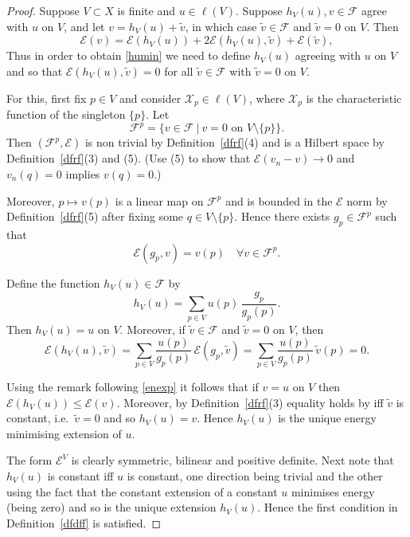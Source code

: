 \documentclass[a4paper]{amsart}
\theoremstyle{plain}
\theoremstyle{definition}
\theoremstyle{remark}
\begin{document}
\begin{proof} Suppose $ V \subset X $ is finite and $ u \in \ell(V) $. 
 Suppose $ h_V(u),v \in \mathcal{F} $ agree  with $ u $ on $ V $,  and  let $   v = h_V(u) + \widetilde{v} $, in which case $ \widetilde{v} \in \mathcal{F} $ and $ \widetilde{v} = 0 $ on $ V $.  Then
\begin{equation} \label{enexp} 
 \mathcal{E} (v) = \mathcal{E} (h_V(u)) + 2\mathcal{E} (h_V(u), \widetilde {v} ) + \mathcal{E} (\widetilde {v} ) ,
\end{equation} 
Thus in order to obtain \eqref{humin} we need to define $ h_V(u) $   agreeing with $ u $ on $ V $ and  so that $ \mathcal{E} (h_V(u), \widetilde {v} ) = 0 $ for all $   \widetilde{v} \in \mathcal{F} $ with $ \widetilde{v} = 0 $ on $ V $. 

For this, first fix $ p \in V $ and consider  $ \mathcal{X} _p \in \ell(V) $, where $ \mathcal{X} _p $ is   the characteristic function of the singleton $ \{p\} $.  Let 
\[
 \mathcal{F} ^p =  \big\{ v \in \mathcal{F}\ \big|\  v = 0 \text{ on } V \setminus \{p\} \big\}.
 \]
 Then $ ( \mathcal{F} ^p, \mathcal{E} ) $ is non trivial by  Definition~\ref{dfrf}(4) and is a Hilbert space by Definition~\ref{dfrf}(3) and (5). (Use (5) to show that  $ \mathcal{E} (v_n - v) \to 0  $ and $ v_n(q) = 0 $ implies $ v(q) = 0 $.)

 Moreover, $ p \mapsto v(p) $ is a linear map on $ \mathcal{F} ^p $ and is bounded in the $ \mathcal{E} $ norm by Definition~\ref{dfrf}(5) after fixing some $ q \in V \setminus \{ p \} $.  Hence there exists $ g_p \in \mathcal{F} ^p $ such that 
 \[
 \mathcal{E} (g_p, v ) = v(p) \quad  \forall v \in \mathcal{F} ^p .
 \]

Define the function $ h_V(u) \in \mathcal{F} $ by 
\[
h_V(u) = \sum_{p\in V} u(p)\, \frac{g_p}{g_p(p)} .
\]
Then $ h_V(u) = u $ on $ V $.  Moreover, if $ \widetilde{v} \in \mathcal{F} $ and $ \widetilde{v} = 0 $ on $ V $, then
\[
\mathcal{E} (h_V(u), \widetilde{v} ) = \sum_{p\in V} \frac{u(p)}{g_p(p)}\, \mathcal{E} (g_p, \widetilde{v}) 
   =  \sum_{p\in V} \frac{u(p)}{g_p(p)}\, \widetilde{v}(p) = 0 .
\]

Using the remark following \eqref{enexp} it follows that if $ v = u $ on $ V $ then $ \mathcal{E}(h_V(u) ) \leq \mathcal{E} (v) $. Moreover,  by Definition~\ref{dfrf}(3) equality holds by iff   $ \widetilde {v} $ is constant, i.e.\  $  \widetilde {v} = 0 $ and so $ h_V(u) = v $. Hence $ h_V(u) $ is the unique energy minimising extension of $ u $.

\medskip The form $ \mathcal{E} ^V $ is clearly symmetric, bilinear and positive definite.  Next note that   $h_V(u)$ is constant iff $ u $  is constant, one direction being trivial and the other using the fact that the constant extension of a constant $ u $ minimises energy (being zero) and so is the unique extension $ h_V(u) $. Hence the first condition in Definition~\ref{dfdff} is satisfied.


\end{proof}
\end{document}
